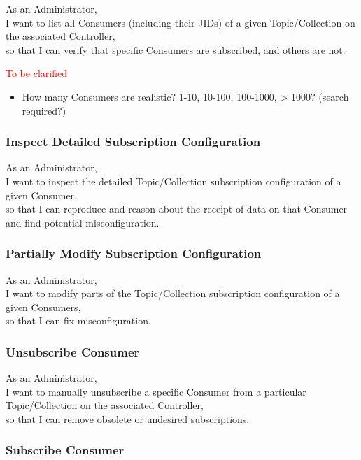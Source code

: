 As an Administrator, \\
I want to list all Consumers (including their JIDs) of a given Topic/Collection on the associated Controller, \\
so that I can verify that specific Consumers are subscribed, and others are not.

\noindent\textcolor{red}{To be clarified}

\begin{itemize}
    \item How many Consumers are realistic? 1-10, 10-100, 100-1000, > 1000? (search required?)
\end{itemize}


\subsubsection{Inspect Detailed Subscription Configuration}

As an Administrator, \\
I want to inspect the detailed Topic/Collection subscription configuration of a given Consumer, \\
so that I can reproduce and reason about the receipt of data on that Consumer
and find potential misconfiguration.

\subsubsection{Partially Modify Subscription Configuration}

As an Administrator, \\
I want to modify parts of the Topic/Collection subscription configuration of a given Consumers, \\
so that I can fix misconfiguration.

\subsubsection{Unsubscribe Consumer}

As an Administrator, \\
I want to manually unsubscribe a specific Consumer from a particular Topic/Collection on the associated Controller, \\
so that I can remove obsolete or undesired subscriptions.

\subsubsection{Subscribe Consumer}

